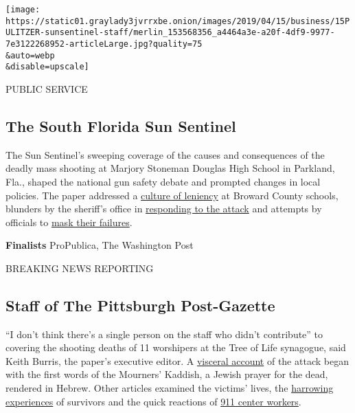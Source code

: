 \texttt{[image: https://static01.graylady3jvrrxbe.onion/images/2019/04/15/business/15PULITZER-sunsentinel-staff/merlin\_153568356\_a4464a3e-a20f-4df9-9977-7e3122268952-articleLarge.jpg?quality=75\\\&auto=webp\\\&disable=upscale]}

PUBLIC SERVICE

\hypertarget{the-south-florida-sun-sentinel}{%
\subsection{The South Florida Sun
Sentinel}\label{the-south-florida-sun-sentinel}}

The Sun Sentinel's sweeping coverage of the causes and consequences of
the deadly mass shooting at Marjory Stoneman Douglas High School in
Parkland, Fla., shaped the national gun safety debate and prompted
changes in local policies. The paper addressed a
\href{https://www.sun-sentinel.com/local/broward/parkland/florida-school-shooting/fl-florida-school-shooting-discipline-20180510-story.html}{culture
of leniency} at Broward County schools, blunders by the sheriff's office
in
\href{http://projects.sun-sentinel.com/2018/sfl-parkland-school-shooting-critical-moments/}{responding
to the attack} and attempts by officials to
\href{https://www.sun-sentinel.com/local/broward/parkland/florida-school-shooting/fl-florida-school-shooting-district-secrecy-20181112-story.html}{mask
their failures}.

\textbf{Finalists} ProPublica, The Washington Post

BREAKING NEWS REPORTING

\hypertarget{staff-of-the-pittsburgh-post-gazette}{%
\subsection{Staff of The Pittsburgh
Post-Gazette}\label{staff-of-the-pittsburgh-post-gazette}}

``I don't think there's a single person on the staff who didn't
contribute'' to covering the shooting deaths of 11 worshipers at the
Tree of Life synagogue, said Keith Burris, the paper's executive editor.
A
\href{https://newsinteractive.post-gazette.com/pittsburgh-squirrel-hill-synagogue-massacre/}{visceral
account} of the attack began with the first words of the Mourners'
Kaddish, a Jewish prayer for the dead, rendered in Hebrew. Other
articles examined the victims' lives, the
\href{https://www.post-gazette.com/news/crime-courts/2018/10/29/tree-of-life-witness-barry-werber-shooting-pittsburgh/stories/201810290101}{harrowing
experiences} of survivors and the quick reactions of
\href{https://www.post-gazette.com/news/crime-courts/2018/11/01/tree-of-life-synagogue-shooting-allegheny-county-911-dispatcher-pittsburgh/stories/201811010157}{911
center workers}.

